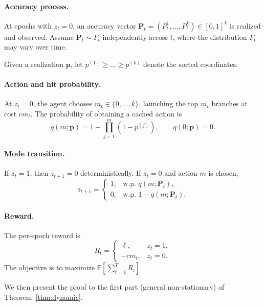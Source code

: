 \paragraph{Accuracy process.}
At epochs with $z_t = 0$, an accuracy vector
$\mathbf P_t = (P_t^1,\dots,P_t^k) \in [0,1]^k$
is realized and observed.
Assume $\mathbf P_t \sim F_t$ independently across $t$,
where the distribution $F_t$ may vary over time.

Given a realization $\mathbf p$, let
$p^{(1)} \ge \dots \ge p^{(k)}$
denote the sorted coordinates.

\paragraph{Action and hit probability.}
At $z_t = 0$, the agent chooses $m_t \in \{0,\dots,k\}$,
launching the top $m_t$ branches at cost $c m_t$.
The probability of obtaining a cached action is
\[
q(m;\mathbf p)
=
1 - \prod_{j=1}^{m} (1 - p^{(j)}),
\qquad
q(0;\mathbf p) = 0.
\]

\paragraph{Mode transition.}
If $z_t = 1$, then $z_{t+1} = 0$ deterministically.
If $z_t = 0$ and action $m$ is chosen,
\[
z_{t+1} =
\begin{cases}
1, & \text{w.p. } q(m;\mathbf P_t), \\
0, & \text{w.p. } 1 - q(m;\mathbf P_t).
\end{cases}
\]

\paragraph{Reward.}
The per-epoch reward is
\[
R_t =
\begin{cases}
\ell, & z_t = 1, \\
- c m_t, & z_t = 0.
\end{cases}
\]
The objective is to maximize
$\mathbb E\!\left[\sum_{t=1}^T R_t\right]$.


We then present the proof to the first part (general non-stationary) of Theorem~\ref{thm:dynamic}.


